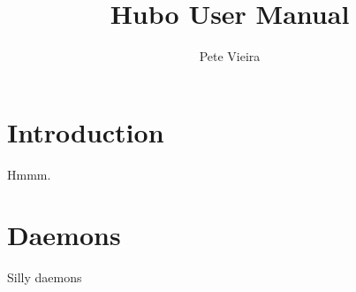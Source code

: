 \documentclass[letterpaper, 10 pt]{report}
\begin{document}
\title{Hubo User Manual}
\author{Pete Vieira}
\maketitle
\pagestyle{empty}

\tableofcontents

\section{Introduction}
Hmmm.


\section{Daemons}
Silly daemons
%

\end{document}
